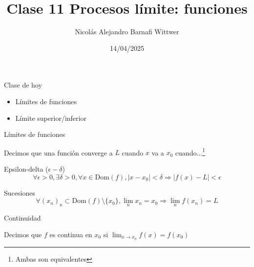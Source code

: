 \documentclass[14pt,aspectratio=169,xcolor=dvipsnames]{beamer}
\title[short title]{Clase 11 Procesos límite: funciones}
\subtitle{}
\author[NA Barnafi] {Nicolás Alejandro Barnafi Wittwer}
\institute[UC|CMM] 
{
    Pontificia Universidad Católica de Chile \\
    Centro de Modelamiento Matemático
}
\date{14/04/2025}
\begin{document}
\begin{frame}
    \maketitle
\end{frame}
\begin{frame}{Clase de hoy}
    \begin{itemize}
        \item Límites de funciones
        \item Límite superior/inferior
    \end{itemize}

    \vspace{1cm}
\end{frame}
\begin{frame}{Límites de funciones}
    \begin{small}
        Decimos que una función converge a $L$ cuando $x$ va a $x_0$ cuando...\footnote{Ambas son equivalentes}
        \begin{block}{Epsilon-delta ($\epsilon-\delta$)}
            $$\forall \epsilon>0, \exists \delta >0, \forall x\in \text{Dom}(f), |x-x_0|<\delta \Rightarrow |f(x) - L| < \epsilon $$
        \end{block}

        \begin{block}{Sucesiones}
            $$\forall (x_n)_n \subset \text{Dom}(f)\setminus \{x_0\}, \lim_n x_n = x_0 \Rightarrow \lim_n f(x_n) = L $$
        \end{block}
    \end{small}
\end{frame}
\begin{frame}{Continuidad}
    \begin{block}{}
        Decimos que $f$ es continua en $x_0$ si $\lim_{x\to x_0}f(x) = f(x_0)$
    \end{block}
\end{frame}
\end{document}
